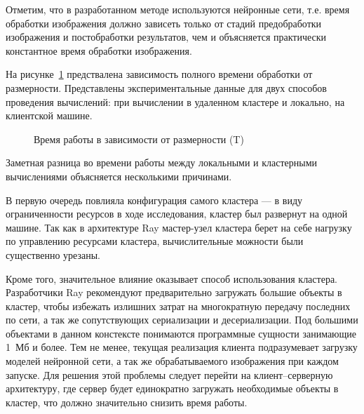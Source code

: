 Отметим, что в разработанном методе используются нейронные сети, т.е. время обработки изображения должно зависеть только от стадий предобработки изображения и постобработки результатов, чем и объясняется практически константное время обработки изображения.

На рисунке~\ref{plt:total-timing} предствалена зависимость полного времени обработки от размерности. Представлены экспериментальные данные для двух способов проведения вычислений: при вычислении в удаленном кластере и локально, на клиентской машине.

\begin{figure}[htp]
	\centering
	\captionsetup{justification=centering}
	\caption{Время работы в зависимости от размерности (T)}
	\label{plt:total-timing}
\end{figure}

Заметная разница во времени работы между локальными и кластерными вычислениями объясняется несколькими причинами.

В первую очередь повлияла конфигурация самого кластера --- в виду ограниченности ресурсов в ходе исследования, кластер был развернут на одной машине. Так как в архитектуре Ray мастер-узел кластера берет на себе нагрузку по управлению ресурсами кластера, вычислительные можности были существенно урезаны.

Кроме того, значительное влияние оказывает способ использования кластера. Разработчики Ray рекомендуют предварительно загружать большие объекты в кластер, чтобы избежать излишних затрат на многократную передачу последних по сети, а так же сопутствующих сериализации и десериализации. Под большими объектами в данном констексте понимаются программные сущности занимающие 1~Мб и более. Тем не менее, текущая реализация клиента подразумевает загрузку моделей нейронной сети, а так же обрабатываемого изображения при каждом запуске. Для решения этой проблемы следует перейти на клиент--серверную архитектуру, где сервер будет единократно загружать необходимые объекты в кластер, что должно значительно снизить время работы.

